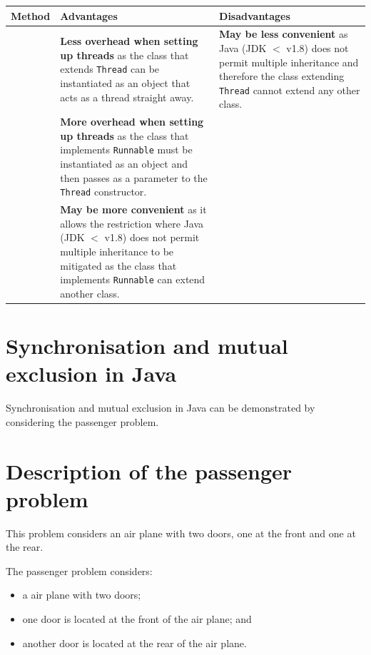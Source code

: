 \documentclass[a4paper]{systems-software}
\begin{document}
\begin{longtabu} to \textwidth {|X[0.85,c]|X[2,l]|X[2,l]|}
	\hline
	\textbf{Method} & \textbf{Advantages} & \textbf{Disadvantages}
	\\ \hline
	& \textbf{Less overhead when setting up threads} as the class that extends \texttt{Thread} can be instantiated as an object that acts as a thread straight away.
	& \textbf{May be less convenient} as Java (JDK $<$ v1.8) does not permit multiple inheritance and therefore the class extending \texttt{Thread} cannot extend any other class.
	\\ \hline
	& \textbf{More overhead when setting up threads} as the class that implements \texttt{Runnable} must be instantiated as an object and then passes as a parameter to the \texttt{Thread} constructor. &
	\\
	& \textbf{May be more convenient} as it allows the restriction where Java (JDK $<$ v1.8) does not permit multiple inheritance to be mitigated as the class that implements \texttt{Runnable} can extend another class. &
	\\ \hline
\end{longtabu}


\section{Synchronisation and mutual exclusion in Java}

Synchronisation and mutual exclusion in Java can be demonstrated by considering the passenger problem.

\section*{Description of the passenger problem}

This problem considers an air plane with two doors, one at the front and one at the rear.

The passenger problem considers:
\begin{itemize}
	\item a air plane with two doors;
	\item one door is located at the front of the air plane; and
	\item another door is located at the rear of the air plane.
\end{itemize}
\end{document}
